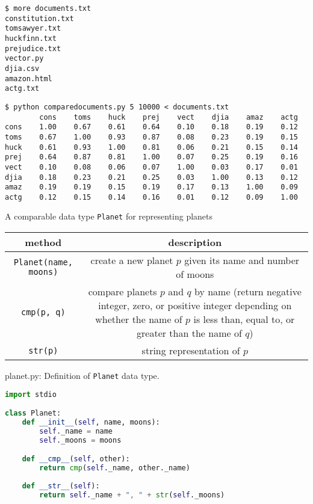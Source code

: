 \documentclass[8pt,a4paper,compress]{beamer}
\begin{document}
\begin{frame}[fragile]
\pause

\begin{lstlisting}[language={}]
$ more documents.txt
constitution.txt
tomsawyer.txt
huckfinn.txt
prejudice.txt
vector.py
djia.csv
amazon.html
actg.txt
\end{lstlisting}

\pause

\begin{lstlisting}[language={}]
$ python comparedocuments.py 5 10000 < documents.txt
        cons    toms    huck    prej    vect    djia    amaz    actg
cons    1.00    0.67    0.61    0.64    0.10    0.18    0.19    0.12
toms    0.67    1.00    0.93    0.87    0.08    0.23    0.19    0.15
huck    0.61    0.93    1.00    0.81    0.06    0.21    0.15    0.14
prej    0.64    0.87    0.81    1.00    0.07    0.25    0.19    0.16
vect    0.10    0.08    0.06    0.07    1.00    0.03    0.17    0.01
djia    0.18    0.23    0.21    0.25    0.03    1.00    0.13    0.12
amaz    0.19    0.19    0.15    0.19    0.17    0.13    1.00    0.09
actg    0.12    0.15    0.14    0.16    0.01    0.12    0.09    1.00
\end{lstlisting}
\end{frame}

\begin{frame}[fragile]
\pause

A comparable data type \lstinline{Planet} for representing planets
\begin{center}
\begin{tabular}{cc}
method & description \\ \hline
\lstinline$Planet(name, moons)$ & create a new planet $p$ given its name and number of moons \\
\lstinline$cmp(p, q)$ & \makecell{compare planets $p$ and $q$ by name (return negative integer, zero, \\ or positive integer depending on whether the name of $p$ is less \\ than, equal to, or greater than the name of $q$)} \\
\lstinline$str(p)$ & string representation of $p$
\end{tabular} 
\end{center}
\end{frame}

\begin{frame}[fragile]
\pause

\begin{framed}
\tiny planet.py: Definition of \lstinline{Planet} data type.
\end{framed}

\begin{lstlisting}[language=Python]
import stdio

class Planet:
    def __init__(self, name, moons):
        self._name = name
        self._moons = moons

    def __cmp__(self, other):
        return cmp(self._name, other._name)
        
    def __str__(self):
        return self._name + ", " + str(self._moons)
\end{lstlisting}
\end{frame}
\end{document}
